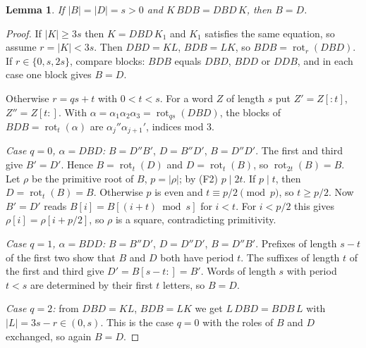 \documentclass[11pt]{article}
\newtheorem{lemma}[theorem]{Lemma}
\theoremstyle{remark}\newtheorem*{remark}{Remark}
\begin{document}
\begin{lemma}\label{lemC}
If \(|B|=|D|=s>0\) and \(K\,BDB=DBD\,K\), then \(B=D\).
\end{lemma}
\begin{proof}
If \(|K|\ge3s\) then \(K=DBD\,K_1\) and \(K_1\) satisfies the same equation, so assume \(r=|K|<3s\). Then \(DBD=KL\), \(BDB=LK\), so \(BDB=\operatorname{rot}_r(DBD)\). If \(r\in\{0,s,2s\}\), compare blocks: \(BDB\) equals \(DBD\), \(BDD\) or \(DDB\), and in each case one block gives \(B=D\).

Otherwise \(r=qs+t\) with \(0<t<s\). For a word \(Z\) of length \(s\) put \(Z'=Z[{:}t]\), \(Z''=Z[t{:}]\). With \(\alpha=\alpha_1\alpha_2\alpha_3=\operatorname{rot}_{qs}(DBD)\), the blocks of \(BDB=\operatorname{rot}_t(\alpha)\) are \(\alpha_j''\alpha_{j+1}'\), indices mod 3.

\emph{Case \(q=0\), \(\alpha=DBD\):} \(B=D''B'\), \(D=B''D'\), \(B=D''D'\). The first and third give \(B'=D'\). Hence \(B=\operatorname{rot}_t(D)\) and \(D=\operatorname{rot}_t(B)\), so \(\operatorname{rot}_{2t}(B)=B\). Let \(\rho\) be the primitive root of \(B\), \(p=|\rho|\); by (F2) \(p\mid 2t\). If \(p\mid t\), then \(D=\operatorname{rot}_t(B)=B\). Otherwise \(p\) is even and \(t\equiv p/2\pmod p\), so \(t\ge p/2\). Now \(B'=D'\) reads \(B[i]=B[(i+t)\bmod s]\) for \(i<t\). For \(i<p/2\) this gives \(\rho[i]=\rho[i+p/2]\), so \(\rho\) is a square, contradicting primitivity.

\emph{Case \(q=1\), \(\alpha=BDD\):} \(B=B''D'\), \(D=D''D'\), \(B=D''B'\). Prefixes of length \(s-t\) of the first two show that \(B\) and \(D\) both have period \(t\). The suffixes of length \(t\) of the first and third give \(D'=B[s-t{:}]=B'\). Words of length \(s\) with period \(t<s\) are determined by their first \(t\) letters, so \(B=D\).

\emph{Case \(q=2\):} from \(DBD=KL\), \(BDB=LK\) we get \(L\,DBD=BDB\,L\) with \(|L|=3s-r\in(0,s)\). This is the case \(q=0\) with the roles of \(B\) and \(D\) exchanged, so again \(B=D\).
\end{proof}
\end{document}
